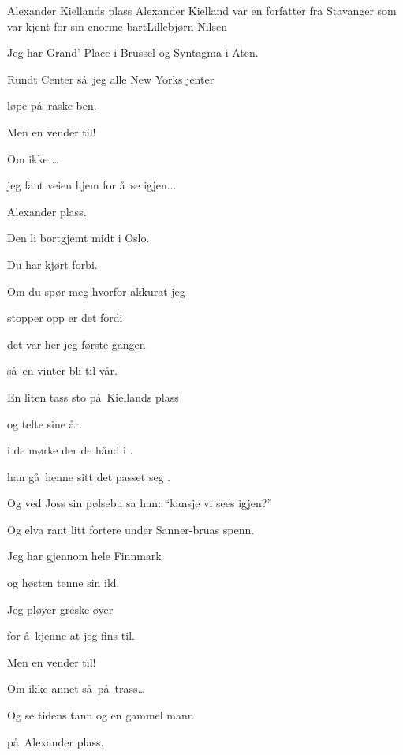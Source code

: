 \begin{SBSong}{Alexander Kiellands plass}
  {Alexander Kielland var en forfatter fra Stavanger som var kjent for sin enorme bart}{Lillebj\o rn Nilsen}
  \begin{SBVerse}
    Jeg har  Grand' Place i Brussel og Syntagma i Aten.

    Rundt  Center s\aa\ jeg alle New Yorks jenter

    l\o pe  p\aa\ raske ben.

    Men en  vender til!

    Om ikke        \ldots {} 

    jeg fant veien hjem for \aa\ se igjen...

    Alexander  plass. 
  \end{SBVerse}
  \begin{SBVerse}
    Den li bortgjemt midt i Oslo.

    Du har  kj\o rt forbi.

    Om du sp\o r meg hvorfor akkurat jeg

    stopper opp er det fordi

    det var her jeg f\o rste gangen

    s\aa\ en vinter bli til v\aa r.

    En liten tass sto p\aa\ Kiellands plass

    og telte sine \aa r.
  \end{SBVerse}
  \begin{SBVerse}
     i de m\o rke  der  de h\aa nd i .

     han g\aa\ henne  sitt  det passet seg .  

    Og ved Joss sin p\o lsebu sa hun: ``kansje vi sees igjen?''

    Og elva rant litt fortere under Sanner-bruas spenn.
  \end{SBVerse}
  \CBPageBrk
  \begin{SBVerse}
    Jeg har  gjennom hele Finnmark

    og  h\o sten tenne sin ild.

    Jeg pl\o yer greske \o yer

    for \aa\ kjenne at jeg fins til.

    Men en  vender til!

    Om ikke annet s\aa\ p\aa\ trass\ldots

    Og se tidens tann og en gammel mann

    p\aa\ Alexander  plass. 
  \end{SBVerse}
\end{SBSong}
